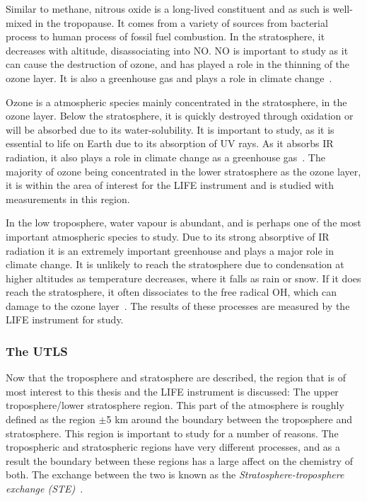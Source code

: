 Similar to methane, nitrous oxide is a long-lived constituent and as such is well-mixed in the tropopause. It comes from a variety of sources from bacterial process to human process of fossil fuel combustion. In the stratosphere, it decreases with altitude, disassociating into NO. NO is important to study as it can cause the destruction of ozone, and has played a role in the thinning of the ozone layer. It is also a greenhouse gas and plays a role in climate change~\citep{atmos_phys_and_climate}.

Ozone is a atmospheric species mainly concentrated in the stratosphere, in the ozone layer. Below the stratosphere, it is quickly destroyed through oxidation or will be absorbed due to its water-solubility. It is important to study, as it is essential to life on Earth due to its absorption of UV rays. As it absorbs IR radiation, it also plays a role in climate change as a greenhouse gas~\citep{atmos_phys_and_climate}. The majority of ozone being concentrated in the lower stratosphere as the ozone layer, it is within the area of interest for the LIFE instrument and is studied with measurements in this region.

In the low troposphere, water vapour is abundant, and is perhaps one of the most important atmospheric species to study. Due to its strong absorptive of IR radiation it is an extremely important greenhouse and plays a major role in climate change. It is unlikely to reach the stratosphere due to condensation at higher altitudes as temperature decreases, where it falls as rain or snow. If it does reach the stratosphere, it often dissociates to the free radical OH, which can damage to the ozone layer~\citep{atmos_phys_and_climate}. The results of these processes are measured by the LIFE instrument for study.

\subsubsection{The UTLS} \label{UTLS}
Now that the troposphere and stratosphere are described, the region that is of most interest to this thesis and the LIFE instrument is discussed: The upper troposphere/lower stratosphere region. This part of the atmosphere is roughly defined as the region $\pm$5 km around the boundary between the troposphere and stratosphere. This region is important to study for a number of reasons. The tropospheric and stratospheric regions have very different processes, and as a result the boundary between these regions has a large affect on the chemistry of both. The exchange between the two is known as the \textit{Stratosphere-troposphere exchange (STE)}~\citep{ext_utls}.

